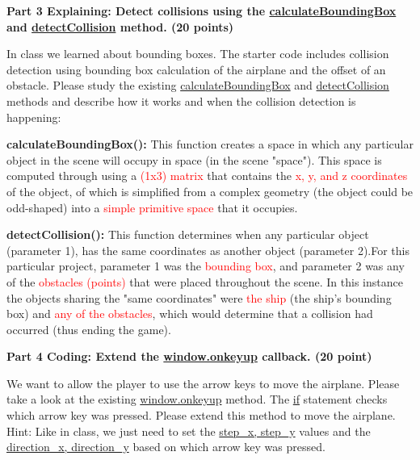 \documentclass[10pt,oneside,onecolumn,letterpaper]{article}
\begin{document}
\vspace{.5cm}

\noindent\textbf{Part 3 Explaining: Detect collisions using the \url{calculateBoundingBox} and \url{detectCollision} method. (20 points)}

\vspace{.5cm}

In class we learned about bounding boxes. The starter code includes collision detection using bounding box calculation of the airplane and the offset of an obstacle. Please study the existing \url{calculateBoundingBox} and \url{detectCollision} methods and describe how it works and when the collision detection is happening:

\vspace{.5cm}

\noindent\textbf{calculateBoundingBox():}
\newline
This function creates a space in which any particular object in the scene will occupy in space (in the scene "space"). This space is computed through using a \textcolor{red}{(1x3) matrix} that contains the \textcolor{red}{x, y, and z coordinates} of the object, of which is simplified from a complex geometry (the object could be odd-shaped) into a \textcolor{red}{simple primitive space} that it occupies.
\newline

\noindent\textbf{detectCollision():}
\newline
This function determines when any particular object (parameter 1), has the same coordinates as another object (parameter 2).For this particular project, parameter 1 was the \textcolor{red}{bounding box}, and parameter 2 was any of the  \textcolor{red}{obstacles (points)} that were placed throughout the scene. In this instance the objects sharing the  "same coordinates" were \textcolor{red}{the ship} (the ship's bounding box) and \textcolor{red}{any of the obstacles}, which would determine that a collision had occurred (thus ending the game).

\vspace{.5cm}

\noindent\textbf{Part 4 Coding: Extend the \url{window.onkeyup} callback. (20 point)}

\vspace{.5cm}

We want to allow the player to use the arrow keys to move the airplane. Please take a look at the existing \url{window.onkeyup} method. The \url{if} statement checks which arrow key was pressed. Please extend this method to move the airplane. Hint: Like in class, we just need to set the \url{step_x, step_y} values and the \url{direction_x, direction_y} based on which arrow key was pressed.
\end{document}
